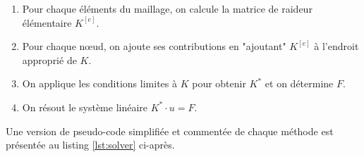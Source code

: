 \documentclass{article}
\begin{document}
\begin{enumerate}
    \item Pour chaque éléments du maillage,
    on calcule la matrice de raideur élémentaire $K^{[e]}$.
    \item Pour chaque nœud, on ajoute ses contributions en "ajoutant" $K^{[e]}$ à l'endroit approprié de $K$.
    \item On applique les conditions limites à $K$ pour obtenir $K^*$ et on détermine $F$.
    \item On résout le système linéaire $K^* \cdot u = F$.
\end{enumerate}

Une version de pseudo-code simplifiée et commentée de chaque méthode 
est présentée au listing \ref{lst:solver} ci-après.

\newpage
\end{document}
